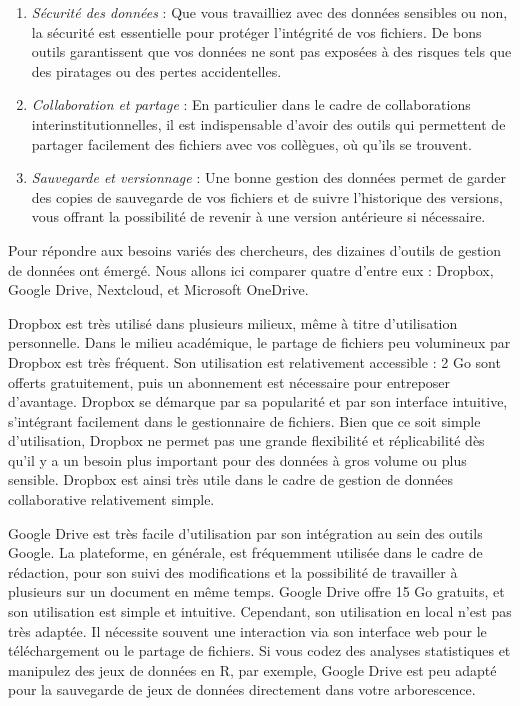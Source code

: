 \documentclass[
  letterpaper,
  DIV=11,
  numbers=noendperiod]{scrreprt}
\begin{document}
\begin{enumerate}
\def\labelenumi{\arabic{enumi}.}
\item
  \emph{Sécurité des données} : Que vous travailliez avec des données
  sensibles ou non, la sécurité est essentielle pour protéger
  l'intégrité de vos fichiers. De bons outils garantissent que vos
  données ne sont pas exposées à des risques tels que des piratages ou
  des pertes accidentelles.
\item
  \emph{Collaboration et partage} : En particulier dans le cadre de
  collaborations interinstitutionnelles, il est indispensable d'avoir
  des outils qui permettent de partager facilement des fichiers avec vos
  collègues, où qu'ils se trouvent.
\item
  \emph{Sauvegarde et versionnage} : Une bonne gestion des données
  permet de garder des copies de sauvegarde de vos fichiers et de suivre
  l'historique des versions, vous offrant la possibilité de revenir à
  une version antérieure si nécessaire.
\end{enumerate}

Pour répondre aux besoins variés des chercheurs, des dizaines d'outils
de gestion de données ont émergé. Nous allons ici comparer quatre
d'entre eux : Dropbox, Google Drive, Nextcloud, et Microsoft OneDrive.

Dropbox est très utilisé dans plusieurs milieux, même à titre
d'utilisation personnelle. Dans le milieu académique, le partage de
fichiers peu volumineux par Dropbox est très fréquent. Son utilisation
est relativement accessible : 2 Go sont offerts gratuitement, puis un
abonnement est nécessaire pour entreposer d'avantage. Dropbox se
démarque par sa popularité et par son interface intuitive, s'intégrant
facilement dans le gestionnaire de fichiers. Bien que ce soit simple
d'utilisation, Dropbox ne permet pas une grande flexibilité et
réplicabilité dès qu'il y a un besoin plus important pour des données à
gros volume ou plus sensible. Dropbox est ainsi très utile dans le cadre
de gestion de données collaborative relativement simple.

Google Drive est très facile d'utilisation par son intégration au sein
des outils Google. La plateforme, en générale, est fréquemment utilisée
dans le cadre de rédaction, pour son suivi des modifications et la
possibilité de travailler à plusieurs sur un document en même temps.
Google Drive offre 15 Go gratuits, et son utilisation est simple et
intuitive. Cependant, son utilisation en local n'est pas très adaptée.
Il nécessite souvent une interaction via son interface web pour le
téléchargement ou le partage de fichiers. Si vous codez des analyses
statistiques et manipulez des jeux de données en R, par exemple, Google
Drive est peu adapté pour la sauvegarde de jeux de données directement
dans votre arborescence.
\end{document}
